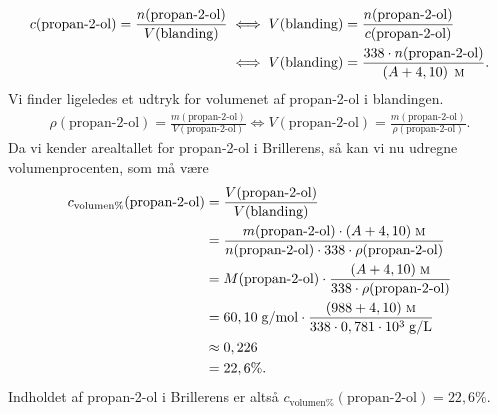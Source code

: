 \documentclass{report}
\begin{document}
\begin{equation*}
\begin{split}
  c(\text{propan-2-ol} )=\frac{n(\text{propan-2-ol})}{V(\text{blanding})} &\iff V(\text{blanding} )=\frac{n(\text{propan-2-ol} )}{c(\text{propan-2-ol} )}\\
  &\iff V(\text{blanding} )=\frac{338 \cdot n(\text{propan-2-ol} )}{\left(A+4,10\right) \;\unit{\textsc{m}} }.
\end{split}
\end{equation*}
Vi finder ligeledes et udtryk for volumenet af propan-2-ol i blandingen.
\begin{equation*}
\begin{split}
  \rho(\text{propan-2-ol} )=\frac{m(\text{propan-2-ol} )}{V(\text{propan-2-ol})} \iff V(\text{propan-2-ol})=\frac{m(\text{propan-2-ol})}{\rho (\text{propan-2-ol} )}.
\end{split}
\end{equation*}
Da vi kender arealtallet for propan-2-ol i Brillerens, så kan vi nu udregne volumenprocenten, som må være
\begin{equation*}
\begin{split}
  c _{\text{volumen\%} }(\text{propan-2-ol})&=\frac{V(\text{propan-2-ol} )}{V(\text{blanding} )}\\
  &=\frac{m(\text{propan-2-ol} ) \cdot (A + 4,10) \;\unit{\textsc{m}} }{n(\text{propan-2-ol} ) \cdot 338 \cdot \rho(\text{propan-2-ol} ) }\\
  &=M(\text{propan-2-ol} ) \cdot  \frac{(A + 4,10) \;\unit{\textsc{m}} }{338 \cdot \rho(\text{propan-2-ol} ) }\\
  &=60,10 \;\unit{g/mol} \cdot \frac{(988+4,10) \;\unit{\textsc{m}} }{338 \cdot 0,781 \cdot 10^3 \;\unit{g/L} }\\
  &\approx 0,226 \\
  &=22,6 \%.
\end{split}
\end{equation*}
Indholdet af propan-2-ol i Brillerens er altså $c _{\text{volumen\%} }(\text{propan-2-ol})=22,6\%$. 
\end{document}
